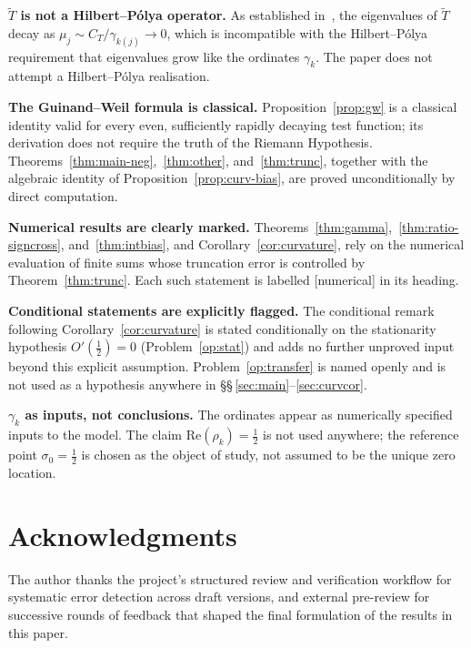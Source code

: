 \documentclass[11pt]{article}
\newcommand{\Tt}{\widetilde{T}}
\newcommand{\CT}{C_{T}}
\begin{document}
\textbf{$\Tt$ is not a Hilbert--P\'olya operator.}
As established in~\cite{Paper5}, the eigenvalues of $\Tt$ decay as
$\mu_j\sim\CT/\gamma_{k(j)}\to 0$, which is incompatible with the
Hilbert--P\'olya requirement that eigenvalues grow like the ordinates
$\gamma_k$.
The paper does not attempt a Hilbert--P\'olya realisation.

\textbf{The Guinand--Weil formula is classical.}
Proposition~\ref{prop:gw} is a classical identity valid for every even,
sufficiently rapidly decaying test function; its derivation does not
require the truth of the Riemann Hypothesis.
Theorems~\ref{thm:main-neg},~\ref{thm:other}, and~\ref{thm:trunc},
together with the algebraic identity of Proposition~\ref{prop:curv-bias},
are proved unconditionally by direct computation.

\textbf{Numerical results are clearly marked.}
Theorems~\ref{thm:gamma},~\ref{thm:ratio-signcross},
and~\ref{thm:intbias}, and Corollary~\ref{cor:curvature}, rely on the
numerical evaluation of finite sums whose truncation error is
controlled by Theorem~\ref{thm:trunc}.
Each such statement is labelled [numerical] in its heading.

\textbf{Conditional statements are explicitly flagged.}
The conditional remark following Corollary~\ref{cor:curvature} is
stated conditionally on the stationarity hypothesis $O'(\tfrac12)=0$
(Problem~\ref{op:stat}) and adds no further unproved input beyond this
explicit assumption.
Problem~\ref{op:transfer} is named openly and is not used as a
hypothesis anywhere in \S\S\,\ref{sec:main}--\ref{sec:curvcor}.

\textbf{$\gamma_k$ as inputs, not conclusions.}
The ordinates appear as numerically specified inputs to the model.
The claim $\mathrm{Re}(\rho_k)=\tfrac12$ is not used anywhere; the
reference point $\sigma_0=\tfrac12$ is chosen as the object of study,
not assumed to be the unique zero location.

\section*{Acknowledgments}

The author thanks the project's structured review and verification
workflow for systematic error detection across draft versions, and
external pre-review for successive rounds of feedback that shaped the
final formulation of the results in this paper.

\end{document}
